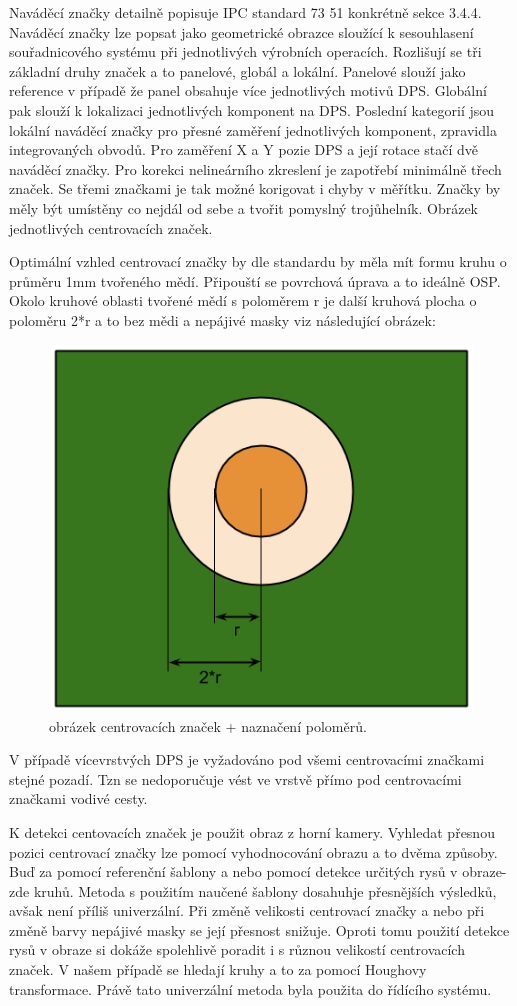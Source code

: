 Naváděcí značky detailně popisuje IPC standard 73 51 konkrétně sekce 3.4.4. Naváděcí značky lze popsat jako geometrické obrazce sloužící k sesouhlasení souřadnicového systému při jednotlivých výrobních operacích.
Rozlišují se tři základní druhy značek a to panelové, globál a lokální. Panelové slouží jako reference v případě že panel obsahuje více jednotlivých motivů DPS. Globální pak slouží k lokalizaci jednotlivých komponent na DPS. Poslední kategorií jsou lokální naváděcí značky pro přesné zaměření jednotlivých komponent, zpravidla integrovaných obvodů.
Pro zaměření X a Y pozie DPS a její rotace stačí dvě naváděcí značky. Pro korekci nelineárního zkreslení je zapotřebí minimálně třech značek. Se třemi značkami je tak možné korigovat i chyby v měřítku. Značky by měly být umístěny co nejdál od sebe a tvořit pomyslný trojůhelník. 
Obrázek jednotlivých centrovacích značek.

Optimální vzhled centrovací značky by dle standardu by měla mít formu kruhu  o průměru 1mm tvořeného mědí. Připouští se povrchová úprava a to ideálně OSP. Okolo kruhové oblasti tvořené mědí s poloměrem r je další kruhová plocha o poloměru 2*r a to bez mědi a nepájivé masky viz následující obrázek:

\begin{figure}[h!]
  \centering
    \includegraphics[width=0.4\linewidth]{obrazky/fiducial.png}%
    \caption{obrázek centrovacích značek + naznačení poloměrů.}
    \label{fig:fiducial}
\end{figure}



V případě vícevrstvých DPS je vyžadováno pod všemi centrovacími značkami stejné pozadí. Tzn se nedoporučuje vést ve vrstvě přímo pod centrovacími značkami vodivé cesty.

K detekci centovacích značek je použit obraz z horní kamery. Vyhledat přesnou pozici centrovací značky lze pomocí vyhodnocování obrazu a to dvěma způsoby. Buď za pomocí referenční šablony a nebo pomocí detekce určitých rysů v obraze- zde kruhů.
Metoda s použitím naučené šablony dosahuhje přesnějších výsledků, avšak není příliš univerzální. Při změně velikosti centrovací značky a nebo při změně barvy nepájivé masky se její přesnost snižuje. 
Oproti tomu použití detekce rysů v obraze si dokáže spolehlivě poradit i s různou velikostí centrovacích značek. V našem případě se hledají kruhy a to za pomocí Houghovy transformace. Právě tato univerzální metoda byla použita do řídícího systému.


